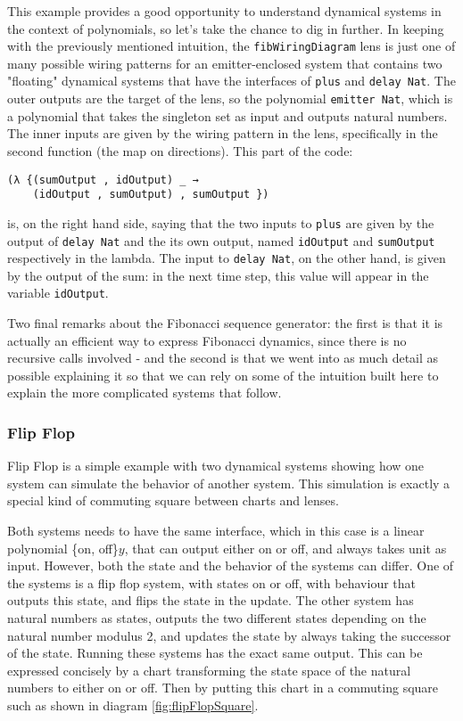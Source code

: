This example provides a good opportunity to understand dynamical systems in the context of polynomials, so let's take the chance to dig in further. In keeping with the previously mentioned intuition, the \texttt{fibWiringDiagram} lens is just one of many possible wiring patterns for an emitter-enclosed system that contains two "floating" dynamical systems that have the interfaces of \texttt{plus} and \texttt{delay Nat}. The outer outputs are the target of the lens, so the polynomial \texttt{emitter Nat}, which is a polynomial that takes the singleton set as input and outputs natural numbers. The inner inputs are given by the wiring pattern in the lens, specifically in the second function (the map on directions). This part of the code:
\begin{verbatim}
(λ {(sumOutput , idOutput) _ → 
    (idOutput , sumOutput) , sumOutput })
\end{verbatim}
is, on the right hand side, saying that the two inputs to \texttt{plus} are given by the output of \texttt{delay Nat} and the its own output, named \texttt{idOutput} and \texttt{sumOutput} respectively in the lambda. The input to \texttt{delay Nat}, on the other hand, is given by the output of the sum: in the next time step, this value will appear in the variable \texttt{idOutput}.

Two final remarks about the Fibonacci sequence generator: the first is that it is actually an efficient way to express Fibonacci dynamics, since there is no recursive calls involved - and the second is that we went into as much detail as possible explaining it so that we can rely on some of the intuition built here to explain the more complicated systems that follow.

\subsubsection{Flip Flop}
Flip Flop is a simple example with two dynamical systems showing how one system can simulate the behavior of another system. This simulation is exactly a special kind of commuting square between charts and lenses. 

Both systems needs to have the same interface, which in this case is a linear polynomial \{on, off\}$y$, that can output either on or off, and always takes unit as input. However, both the state and the behavior of the systems can differ. One of the systems is a flip flop system, with states on or off, with behaviour that outputs this state, and flips the state in the update. The other system has natural numbers as states, outputs the two different states depending on the natural number modulus 2, and updates the state by always taking the successor of the state. Running these systems has the exact same output. This can be expressed concisely by a chart transforming the state space of the natural numbers to either on or off. Then by putting this chart in a commuting square such as shown in diagram \ref{fig:flipFlopSquare}.

